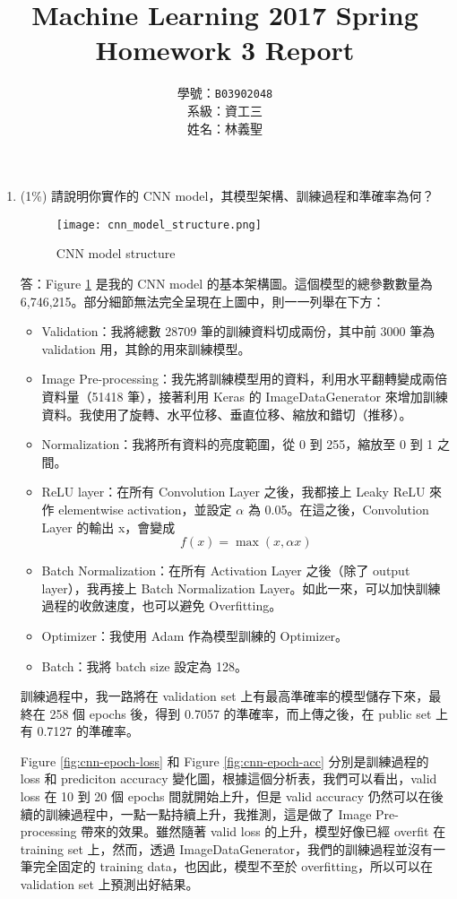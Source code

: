 \documentclass[12pt,a4paper]{extarticle}
\title{Machine Learning 2017 Spring\\Homework 3 Report}
\author{學號：\texttt{B03902048}\\系級：資工三\\姓名：林義聖}
\date{}
\begin{document}
\maketitle

\begin{enumerate}
	\item (1\%) 請說明你實作的 CNN model，其模型架構、訓練過程和準確率為何？

  \begin{figure}
    \centering
    \texttt{[image: cnn\_model\_structure.png]}
    \caption{CNN model structure}
    \label{fig:cnn-model-structure}
  \end{figure}

	\par 答：Figure \ref{fig:cnn-model-structure} 是我的 CNN model 的基本架構圖。這個模型的總參數數量為 6,746,215。部分細節無法完全呈現在上圖中，則一一列舉在下方：
  \begin{itemize}
    \item Validation：我將總數 28709 筆的訓練資料切成兩份，其中前 3000 筆為 validation 用，其餘的用來訓練模型。
    \item Image Pre-processing：我先將訓練模型用的資料，利用水平翻轉變成兩倍資料量（51418 筆），接著利用 Keras 的 ImageDataGenerator 來增加訓練資料。我使用了旋轉、水平位移、垂直位移、縮放和錯切（推移）。
    \item Normalization：我將所有資料的亮度範圍，從 0 到 255，縮放至 0 到 1 之間。
    \item ReLU layer：在所有 Convolution Layer 之後，我都接上 Leaky ReLU 來作 elementwise activation，並設定 $\alpha$ 為 0.05。在這之後，Convolution Layer 的輸出 x，會變成
    $$f(x) = \max(x, \alpha x)$$
    \item Batch Normalization：在所有 Activation Layer 之後（除了 output layer），我再接上 Batch Normalization Layer。如此一來，可以加快訓練過程的收斂速度，也可以避免 Overfitting。
    \item Optimizer：我使用 Adam 作為模型訓練的 Optimizer。
    \item Batch：我將 batch size 設定為 128。
  \end{itemize}
  \par 訓練過程中，我一路將在 validation set 上有最高準確率的模型儲存下來，最終在 258 個 epochs 後，得到 0.7057 的準確率，而上傳之後，在 public set 上有 0.7127 的準確率。
  \par Figure \ref{fig:cnn-epoch-loss} 和 Figure \ref{fig:cnn-epoch-acc} 分別是訓練過程的 loss 和 prediciton accuracy 變化圖，根據這個分析表，我們可以看出，valid loss 在 10 到 20 個 epochs 間就開始上升，但是 valid accuracy 仍然可以在後續的訓練過程中，一點一點持續上升，我推測，這是做了 Image Pre-processing 帶來的效果。雖然隨著 valid loss 的上升，模型好像已經 overfit 在 training set 上，然而，透過 ImageDataGenerator，我們的訓練過程並沒有一筆完全固定的 training data，也因此，模型不至於 overfitting，所以可以在 validation set 上預測出好結果。


\end{enumerate}
\end{document}

